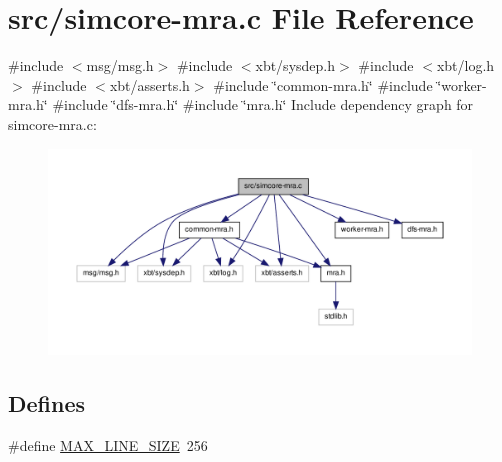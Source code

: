 \hypertarget{simcore-mra_8c}{\section{src/simcore-\/mra.c \-File \-Reference}
\label{simcore-mra_8c}
}
{\ttfamily \#include $<$msg/msg.\-h$>$}\*
{\ttfamily \#include $<$xbt/sysdep.\-h$>$}\*
{\ttfamily \#include $<$xbt/log.\-h$>$}\*
{\ttfamily \#include $<$xbt/asserts.\-h$>$}\*
{\ttfamily \#include \char`\"{}common-\/mra.\-h\char`\"{}}\*
{\ttfamily \#include \char`\"{}worker-\/mra.\-h\char`\"{}}\*
{\ttfamily \#include \char`\"{}dfs-\/mra.\-h\char`\"{}}\*
{\ttfamily \#include \char`\"{}mra.\-h\char`\"{}}\*
\-Include dependency graph for simcore-\/mra.c\-:\nopagebreak
\begin{figure}[H]
\begin{center}
\leavevmode
\includegraphics[width=350pt]{simcore-mra_8c__incl}
\end{center}
\end{figure}
\subsection*{\-Defines}
\begin{DoxyCompactItemize}
\item 
\#define \hyperlink{simcore-mra_8c_a706068f562dd5c64a8b7bbd4b2298dd1}{\-M\-A\-X\-\_\-\-L\-I\-N\-E\-\_\-\-S\-I\-Z\-E}~256
\end{DoxyCompactItemize}
